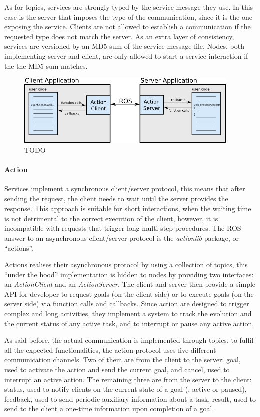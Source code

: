 As for topics, services are strongly typed by the service message they use. In this case is the server that imposes the type of the communication, since it is the one exposing the service. Clients are not allowed to establish a communication if the requested type does not match the server. As an extra layer of consistency, services are versioned by an MD5 sum of the service message file. Nodes, both implementing server and client, are only allowed to start a service interaction if the the MD5 sum matches.

\begin{figure}[t]
    \centering
    \includegraphics[width=0.95\textwidth]{gfx/ros/action}
    \caption{TODO}\label{fig:ros-action}
\end{figure}

\paragraph{Action} Services implement a synchronous client/server protocol, this means that after sending the request, the client needs to wait until the server provides the response. This approach is suitable for short interactions, when the waiting time is not detrimental to the correct execution of the client, however, it is incompatible with requests that trigger long multi-step procedures. The ROS answer to an asynchronous client/server protocol is the \textit{actionlib} package, or ``actions''.

Actions realises their asynchronous protocol by using a collection of topics, this ``under the hood'' implementation is hidden to nodes by providing two interfaces: an \textit{ActionClient} and an \textit{ActionServer}. The client and server then provide a simple API for developer to request goals (on the client side) or to execute goals (on the server side) via function calls and callbacks. Since action are designed to trigger complex and long activities, they implement a system to track the evolution and the current status of any active task, and to interrupt or pause any active action.

As said before, the actual communication is implemented through topics, to fulfil all the expected functionalities, the action protocol uses five different communication channels. Two of them are from the client to the server: goal, used to activate the action and send the current goal, and cancel, used to interrupt an active action. The remaining three are from the server to the client: status, used to notify clients on the current state of a goal (\eg, active or paused), feedback, used to send periodic auxiliary information about a task, result, used to send to the client a one-time information upon completion of a goal.

